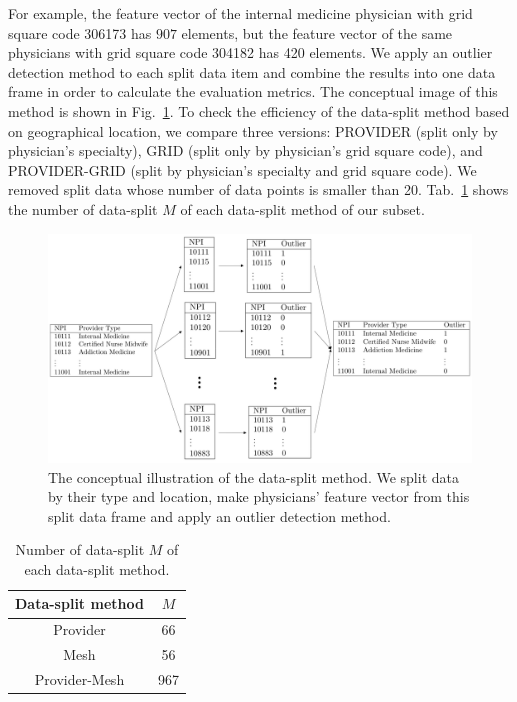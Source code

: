 \documentclass[dvipdfmx, english]{ampmt}             %
\newcommand{\Tabref}[1]{Tab.~\ref{#1}}
\newcommand{\Figref}[1]{Fig.~\ref{#1}}
\begin{document}
For example, the feature vector of the internal medicine physician with grid square code 306173 has $907$ elements, but
the feature vector of the same physicians with grid square code 304182 has 420 elements. We apply an outlier detection method to each split data item and combine the results into one data frame in order to calculate the evaluation metrics.
The conceptual image of this method is shown in \Figref{fig:data-split}. To check the efficiency of the data-split method based on geographical location, we compare three versions: PROVIDER (split only by physician’s specialty), GRID (split only by physician's grid square code), and  PROVIDER-GRID (split by physician’s specialty and grid square code).
We removed split data whose number of data points is smaller than 20. \Tabref{tb:Nk} shows the number of data-split $M$ of each data-split method of our subset.

\begin{figure}[H]
\centerline{\includegraphics[scale=0.4]{../img/data-split.png}}
\caption{The conceptual illustration of the data-split method. We split data by their type and location, make physicians' feature vector from this split data frame and apply an outlier detection method.}
\label{fig:data-split}
\end{figure}

\begin{table}[H]
\centering
\caption{Number of data-split $M$ of each data-split method.}
\begin{tabular}{cc}
\hline \hline
Data-split method  & $M$ \\
\hline 
Provider & 66 \\
Mesh & 56 \\
Provider-Mesh & 967 \\
\hline
\end{tabular}
\label{tb:Nk}
\end{table}
\end{document}
